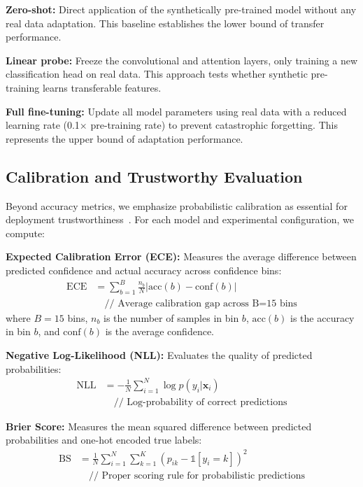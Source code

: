 \documentclass[lettersize,journal]{IEEEtran}
\begin{document}
\textbf{Zero-shot:} Direct application of the synthetically pre-trained model without any real data adaptation. This baseline establishes the lower bound of transfer performance.

\textbf{Linear probe:} Freeze the convolutional and attention layers, only training a new classification head on real data. This approach tests whether synthetic pre-training learns transferable features.

\textbf{Full fine-tuning:} Update all model parameters using real data with a reduced learning rate (0.1× pre-training rate) to prevent catastrophic forgetting. This represents the upper bound of adaptation performance.

\subsection{Calibration and Trustworthy Evaluation}

Beyond accuracy metrics, we emphasize probabilistic calibration as essential for deployment trustworthiness~\cite{calibration_guo2017}. For each model and experimental configuration, we compute:

\begin{tcolorbox}[colback=cyan!5!white,colframe=cyan!50!black,title=\textbf{Calibration Metrics}]
\textbf{Expected Calibration Error (ECE):} Measures the average difference between predicted confidence and actual accuracy across confidence bins:
\begin{align}
\text{ECE} &= \sum_{b=1}^{B} \frac{n_b}{N} |\text{acc}(b) - \text{conf}(b)| \nonumber\\
&\quad \text{// Average calibration gap across B=15 bins} \nonumber
\end{align}
where $B=15$ bins, $n_b$ is the number of samples in bin $b$, $\text{acc}(b)$ is the accuracy in bin $b$, and $\text{conf}(b)$ is the average confidence.

\textbf{Negative Log-Likelihood (NLL):} Evaluates the quality of predicted probabilities:
\begin{align}
\text{NLL} &= -\frac{1}{N} \sum_{i=1}^{N} \log p(y_i | \mathbf{x}_i) \nonumber\\
&\quad \text{// Log-probability of correct predictions} \nonumber
\end{align}

\textbf{Brier Score:} Measures the mean squared difference between predicted probabilities and one-hot encoded true labels:
\begin{align}
\text{BS} &= \frac{1}{N} \sum_{i=1}^{N} \sum_{k=1}^{K} (p_{ik} - \mathbb{1}[y_i = k])^2 \nonumber\\
&\quad \text{// Proper scoring rule for probabilistic predictions} \nonumber
\end{align}
\end{tcolorbox}
\end{document}
